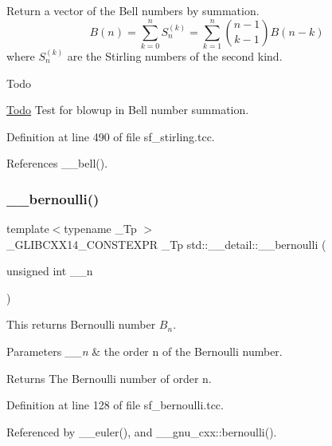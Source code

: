 Return a vector of the Bell numbers by summation. \[ B(n) = \sum_{k=0}^{n}S_n^{(k)} = \sum_{k=1}^{n}{n-1 \choose k-1}B(n-k) \] where $ S_n^{(k)} $ are the Stirling numbers of the second kind. \begin{DoxyRefDesc}{Todo}
\item[\hyperlink{todo__todo000016}{Todo}]Test for blowup in Bell number summation. \end{DoxyRefDesc}


Definition at line 490 of file sf\+\_\+stirling.\+tcc.



References \+\_\+\+\_\+bell().

\mbox{\label{namespacestd_1_1____detail_a68ae2aecb4cdf37b72cd60409cdc500c}} 
\subsubsection{\texorpdfstring{\+\_\+\+\_\+bernoulli()}{\_\_bernoulli()}\hspace{0.1cm}{\footnotesize\ttfamily [1/2]}}
{\footnotesize\ttfamily template$<$typename \+\_\+\+Tp $>$ \\
\+\_\+\+G\+L\+I\+B\+C\+X\+X14\+\_\+\+C\+O\+N\+S\+T\+E\+X\+PR \+\_\+\+Tp std\+::\+\_\+\+\_\+detail\+::\+\_\+\+\_\+bernoulli (\begin{DoxyParamCaption}\item[{unsigned int}]{\+\_\+\+\_\+n }\end{DoxyParamCaption})}



This returns Bernoulli number $ B_n $. 


\begin{DoxyParams}{Parameters}
{\em \+\_\+\+\_\+n} & the order n of the Bernoulli number. \\
\hline
\end{DoxyParams}
\begin{DoxyReturn}{Returns}
The Bernoulli number of order n. 
\end{DoxyReturn}


Definition at line 128 of file sf\+\_\+bernoulli.\+tcc.



Referenced by \+\_\+\+\_\+euler(), and \+\_\+\+\_\+gnu\+\_\+cxx\+::bernoulli().

